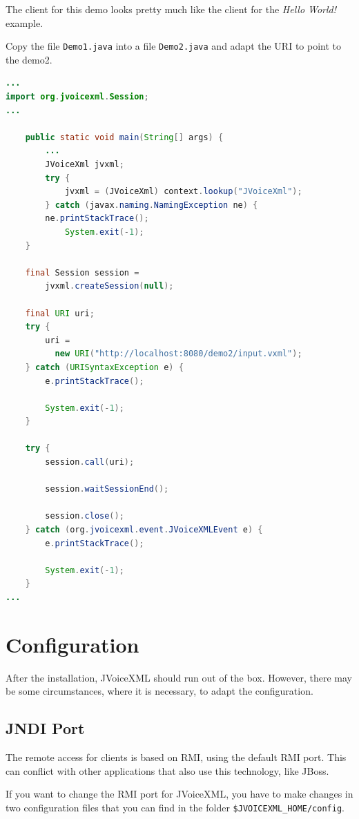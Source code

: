 \documentclass[11pt,a4paper]{article}
\begin{document}
The client for this demo looks pretty much like the client for the \emph{Hello
World!} example.

Copy the file \texttt{Demo1.java} into a file \texttt{Demo2.java} and adapt the
URI to point to the demo2.

\begin{lstlisting}[language=Java]
...
import org.jvoicexml.Session;
...

    public static void main(String[] args) {
        ...
        JVoiceXml jvxml;
        try {
            jvxml = (JVoiceXml) context.lookup("JVoiceXml");
        } catch (javax.naming.NamingException ne) {
	    ne.printStackTrace();
            System.exit(-1);
    }

    final Session session = 
        jvxml.createSession(null);

    final URI uri;
    try {
        uri = 
          new URI("http://localhost:8080/demo2/input.vxml");
    } catch (URISyntaxException e) {
        e.printStackTrace();

        System.exit(-1);
    }

    try {
        session.call(uri);

        session.waitSessionEnd();

        session.close();
    } catch (org.jvoicexml.event.JVoiceXMLEvent e) {
        e.printStackTrace();

        System.exit(-1);
    }
...
\end{lstlisting}

\section{Configuration}

After the installation, JVoiceXML should run out of the box. However, there may 
be some circumstances, where it is necessary, to adapt the configuration.

\subsection{JNDI Port}

The remote access for clients is based on RMI, using the default RMI port. This
can conflict with other applications that also use this technology, like JBoss.

If you want to change the RMI port for JVoiceXML, you have to make changes in 
two configuration files that you can find in the folder 
\texttt{\$JVOICE\-XML\_HOME/config}.
\end{document}
